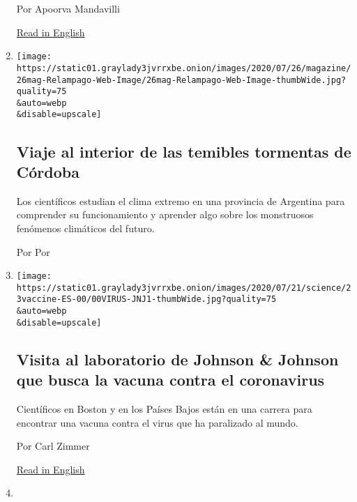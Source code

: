 \begin{enumerate}
  Por Apoorva Mandavilli

  \href{https://www.nytimes3xbfgragh.onion/2020/07/22/health/covid-antibodies-herd-immunity.html}{Read
  in English}
\item
  \href{/es/interactive/2020/07/23/espanol/ciencia-y-tecnologia/cordoba-tormentas-argentina.html}{}

  \texttt{[image: https://static01.graylady3jvrrxbe.onion/images/2020/07/26/magazine/26mag-Relampago-Web-Image/26mag-Relampago-Web-Image-thumbWide.jpg?quality=75\\\&auto=webp\\\&disable=upscale]}

  \hypertarget{viaje-al-interior-de-las-temibles-tormentas-de-cuxf3rdoba}{%
  \subsection{Viaje al interior de las temibles tormentas de
  Córdoba}\label{viaje-al-interior-de-las-temibles-tormentas-de-cuxf3rdoba}}

  Los científicos estudian el clima extremo en una provincia de
  Argentina para comprender su funcionamiento y aprender algo sobre los
  monstruosos fenómenos climáticos del futuro.

  Por Por
\item
  \href{/es/2020/07/23/espanol/ciencia-y-tecnologia/vacuna-coronavirus.html}{}

  \texttt{[image: https://static01.graylady3jvrrxbe.onion/images/2020/07/21/science/23vaccine-ES-00/00VIRUS-JNJ1-thumbWide.jpg?quality=75\\\&auto=webp\\\&disable=upscale]}

  \hypertarget{visita-al-laboratorio-de-johnson--johnson-que-busca-la-vacuna-contra-el-coronavirus}{%
  \subsection{Visita al laboratorio de Johnson \& Johnson que busca la
  vacuna contra el
  coronavirus}\label{visita-al-laboratorio-de-johnson--johnson-que-busca-la-vacuna-contra-el-coronavirus}}

  Científicos en Boston y en los Países Bajos están en una carrera para
  encontrar una vacuna contra el virus que ha paralizado al mundo.

  Por Carl Zimmer

  \href{https://www.nytimes3xbfgragh.onion/2020/07/17/health/coronavirus-vaccine-johnson-janssen.html}{Read
  in English}
\item
  \href{/es/2020/07/13/espanol/ciencia-y-tecnologia/tengo-covid-que-hago.html}{}


\end{enumerate}
